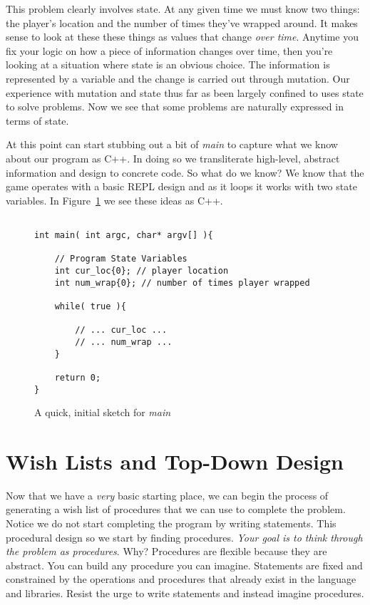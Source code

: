 \documentclass[nobib]{tufte-handout}
\begin{document}
This problem clearly involves state. At any given time we must know two things: the player's location and the number of times they've wrapped around. It makes sense to look at these these things as values that change \textit{over time}. Anytime you fix your logic on how a piece of information changes over time, then you're looking at a situation where state is an obvious choice. The information is represented by a variable and the change is carried out through mutation. Our experience with mutation and state thus far as been largely confined to uses state to solve problems. Now we see that some problems are naturally expressed in terms of state.

At this point can start stubbing out a bit of \textit{main} to capture what we know about our program as C++. In doing so we  transliterate high-level, abstract information and design to concrete code.  So what do we know? We know that the game operates with a basic REPL design and as it loops it works with two state variables. In Figure~\ref{fig:mainstub1} we see these ideas as C++.

\begin{figure}[!htbp]
\begin{lstlisting}

int main( int argc, char* argv[] ){

	// Program State Variables
	int cur_loc{0}; // player location
	int num_wrap{0}; // number of times player wrapped

	while( true ){

		// ... cur_loc ...
	 	// ... num_wrap ...
	}

	return 0;
}

\end{lstlisting}
\caption{A quick, initial sketch for \textit{main}}
\label{fig:mainstub1}
\end{figure}

\section{Wish Lists and Top-Down Design}

Now that we have a \textit{very} basic starting place, we can begin the process of generating a wish list of procedures that we can use to complete the problem. Notice we do not start completing the program by writing statements. This procedural design so we start by finding procedures. \textit{Your goal is to think through the problem as procedures}. Why? Procedures are flexible because they are abstract. You can build any procedure you can imagine. Statements are fixed and constrained by the operations and procedures that already exist in the language and libraries. Resist the urge to write statements and instead imagine procedures.
\end{document}
